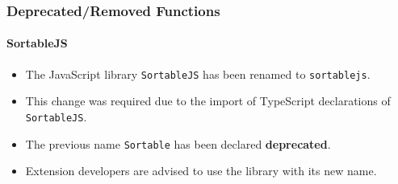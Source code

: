 %

\begin{frame}[fragile]
	\frametitle{Deprecated/Removed Functions}
	\framesubtitle{SortableJS}

	\begin{itemize}
		\item The JavaScript library \texttt{SortableJS} has been renamed to \texttt{sortablejs}.

		\item This change was required due to the import of TypeScript declarations
			of \texttt{SortableJS}.

		\item The previous name \texttt{Sortable} has been declared \textbf{deprecated}.

		\item Extension developers are advised to use the library with its new name.
	\end{itemize}

\end{frame}

